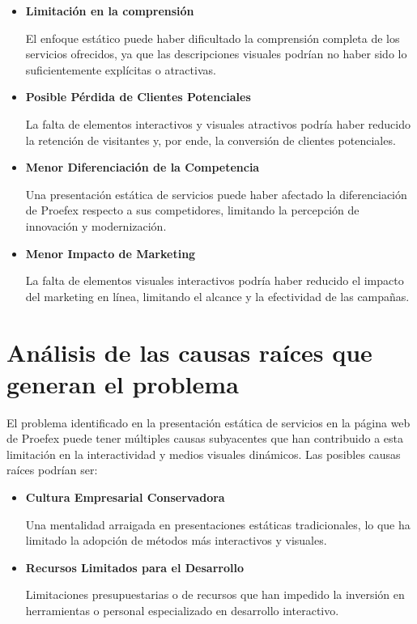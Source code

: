 \begin{itemize}
\item \textbf{Limitación en la comprensión}

El enfoque estático puede haber dificultado la comprensión completa de los servicios
ofrecidos, ya que las descripciones visuales podrían no haber sido lo suficientemente
explícitas o atractivas.

\item \textbf{Posible Pérdida de Clientes Potenciales}

La falta de elementos interactivos y visuales atractivos podría haber reducido la
retención de visitantes y, por ende, la conversión de clientes potenciales.

\item \textbf{Menor Diferenciación de la Competencia}

Una presentación estática de servicios puede haber afectado la diferenciación
de Proefex respecto a sus competidores, limitando la percepción de innovación
y modernización.

\item \textbf{Menor Impacto de Marketing}

La falta de elementos visuales interactivos podría haber reducido el impacto del
marketing en línea, limitando el alcance y la efectividad de las campañas.

\end{itemize}

\section{Análisis de las causas raíces que generan el problema}

El problema identificado en la presentación estática de servicios en la página
web de Proefex puede tener múltiples causas subyacentes que han contribuido a
esta limitación en la interactividad y medios visuales dinámicos. Las posibles
causas raíces podrían ser:

\begin{itemize}
\item \textbf{Cultura Empresarial Conservadora}

Una mentalidad arraigada en presentaciones estáticas tradicionales, lo que ha
limitado la adopción de métodos más interactivos y visuales.

\item \textbf{Recursos Limitados para el Desarrollo}

Limitaciones presupuestarias o de recursos que han impedido la inversión en
herramientas o personal especializado en desarrollo interactivo.

\end{itemize}

